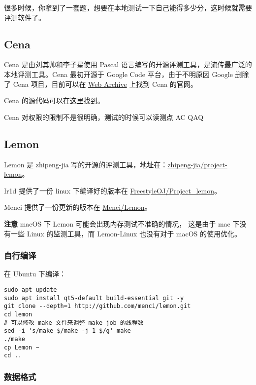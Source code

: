 
很多时候，你拿到了一套题，想要在本地测试一下自己能得多少分，这时候就需要评测软件了。

\subsection{Cena}

Cena 是由刘其帅和李子星使用 Pascal 语言编写的开源评测工具，是流传最广泛的本地评测工具。Cena 最初开源于 Google Code 平台，由于不明原因 Google 删除了 Cena 项目，目前可以在 \href{https://web.archive.org/web/20131023112258/http://code.google.com/p/cena/}{Web Archive} 上找到 Cena 的官网。

Cena 的源代码可以在\href{https://github.com/billchenchina/cena}{这里}找到。

Cena 对权限的限制不是很明确，测试的时候可以读测点 AC QAQ

\subsection{Lemon}

Lemon 是 zhipeng-jia 写的开源的评测工具，地址在：\href{https://github.com/zhipeng-jia/project-lemon}{zhipeng-jia/project-lemon}。

Ir1d 提供了一份 linux 下编译好的版本在 \href{https://github.com/FreestyleOJ/Project_lemon/tree/Built}{FreestyleOJ/Project\_lemon}。

Menci 提供了一份更新的版本在 \href{https://github.com/Menci/Lemon/}{Menci/Lemon}。

\textbf{注意} macOS 下 Lemon 可能会出现内存测试不准确的情况， 这是由于 mac 下没有一些 Linux 的监测工具，而 Lemon-Linux 也没有对于 macOS 的使用优化。

\subsubsection{自行编译}

在 Ubuntu 下编译：

\begin{verbatim}
sudo apt update
sudo apt install qt5-default build-essential git -y
git clone --depth=1 http://github.com/menci/lemon.git
cd lemon
# 可以修改 make 文件来调整 make job 的线程数
sed -i 's/make $/make -j 1 $/g' make
./make
cp Lemon ~
cd ..
\end{verbatim}

\subsubsection{数据格式}

